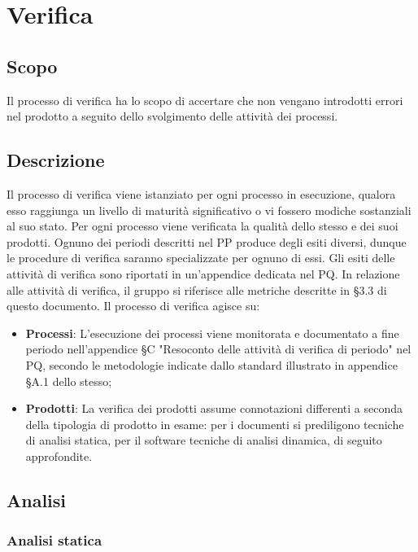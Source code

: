 \documentclass[../NormediProgetto.tex]{subfiles}
\begin{document}
	
	
	
\section{Verifica}

\subsection{Scopo}
Il processo di verifica ha lo scopo di accertare che non vengano introdotti errori nel prodotto a seguito dello svolgimento delle attività dei processi.

\subsection{Descrizione}

Il processo di verifica viene istanziato per ogni processo in esecuzione, qualora esso raggiunga un livello di maturità significativo o vi fossero modiche sostanziali al suo stato. Per ogni processo viene verificata la qualità dello stesso e dei suoi prodotti. Ognuno dei periodi descritti nel PP produce degli esiti diversi, dunque le procedure di verifica saranno specializzate per ognuno di essi. Gli esiti delle attività di
verifica sono riportati in un'appendice dedicata nel PQ. 
In relazione alle attività di verifica, il gruppo si riferisce alle metriche descritte in §3.3 di questo documento. Il processo di verifica agisce su:
\begin{itemize}
	\item \textbf{Processi}: L'esecuzione dei processi viene monitorata e documentato a fine periodo nell'appendice §C "Resoconto delle attività di verifica di periodo" nel PQ, secondo le metodologie indicate dallo standard  illustrato in appendice §A.1 dello stesso;
	\item \textbf{Prodotti}: La verifica dei prodotti assume connotazioni differenti a seconda della tipologia di prodotto in esame: per i documenti si prediligono tecniche di analisi statica, per il software tecniche di analisi dinamica, di seguito approfondite.
\end{itemize}

\subsection{Analisi}

\subsubsection{Analisi statica}
\end{document}
